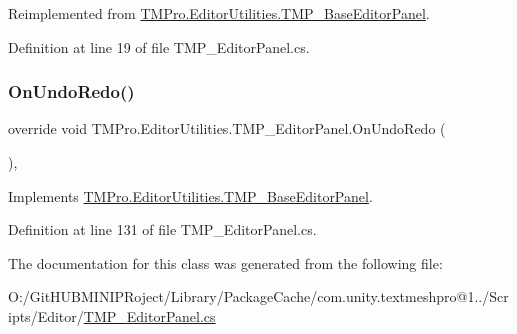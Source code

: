 Reimplemented from \mbox{\hyperlink{class_t_m_pro_1_1_editor_utilities_1_1_t_m_p___base_editor_panel_a3a60309b317f09709852e0c8013e6849}{T\+M\+Pro.\+Editor\+Utilities.\+T\+M\+P\+\_\+\+Base\+Editor\+Panel}}.



Definition at line 19 of file T\+M\+P\+\_\+\+Editor\+Panel.\+cs.

\mbox{\label{class_t_m_pro_1_1_editor_utilities_1_1_t_m_p___editor_panel_a30162b44fb34ae79fc36af4984f49062}} 
\subsubsection{\texorpdfstring{OnUndoRedo()}{OnUndoRedo()}}
{\footnotesize\ttfamily override void T\+M\+Pro.\+Editor\+Utilities.\+T\+M\+P\+\_\+\+Editor\+Panel.\+On\+Undo\+Redo (\begin{DoxyParamCaption}{ }\end{DoxyParamCaption})\hspace{0.3cm}{\ttfamily [protected]}, {\ttfamily [virtual]}}



Implements \mbox{\hyperlink{class_t_m_pro_1_1_editor_utilities_1_1_t_m_p___base_editor_panel_a03f1303365c95a93f4fae9cb11af7df7}{T\+M\+Pro.\+Editor\+Utilities.\+T\+M\+P\+\_\+\+Base\+Editor\+Panel}}.



Definition at line 131 of file T\+M\+P\+\_\+\+Editor\+Panel.\+cs.



The documentation for this class was generated from the following file\+:\begin{DoxyCompactItemize}
\item 
O\+:/\+Git\+H\+U\+B\+M\+I\+N\+I\+P\+Roject/\+Library/\+Package\+Cache/com.\+unity.\+textmeshpro@1../\+Scripts/\+Editor/\mbox{\hyperlink{_t_m_p___editor_panel_8cs}{T\+M\+P\+\_\+\+Editor\+Panel.\+cs}}\end{DoxyCompactItemize}
